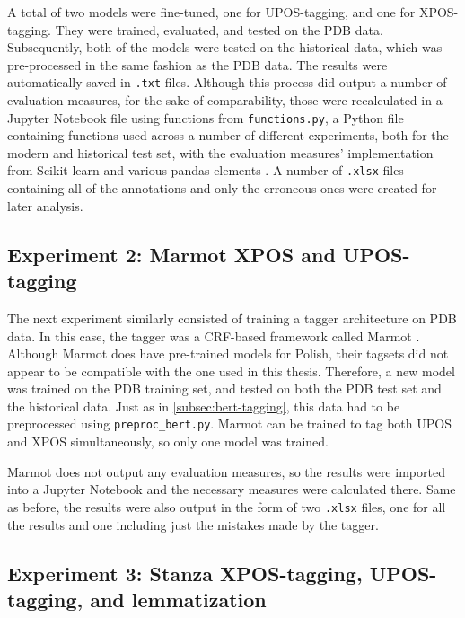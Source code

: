 A total of two models were fine-tuned, one for UPOS-tagging, and one for XPOS-tagging. They were trained, evaluated, and tested on the PDB data. Subsequently, both of the models were tested on the historical data, which was pre-processed in the same fashion as the PDB data. The results were automatically saved in \texttt{.txt} files. Although this process did output a number of evaluation measures, for the sake of comparability, those were recalculated in a Jupyter Notebook file using functions from \texttt{functions.py}, a Python file containing functions used across a number of different experiments, both for the modern and historical test set, with the evaluation measures' implementation from Scikit-learn and various pandas elements \citep{scikit-learn, reback2020pandas, mckinney-proc-scipy-2010}. A number of \texttt{.xlsx} files containing all of the annotations and only the erroneous ones were created for later analysis. 

\subsection{Experiment 2: Marmot XPOS and UPOS-tagging}
\label{subsec:marmot-tagging}

The next experiment similarly consisted of training a tagger architecture on PDB data. In this case, the tagger was a CRF-based framework called Marmot \citep{mueller-etal-2013-efficient}. Although Marmot does have pre-trained models for Polish, their tagsets did not appear to be compatible with the one used in this thesis. Therefore, a new model was trained on the PDB training set, and tested on both the PDB test set and the historical data. Just as in \autoref{subsec:bert-tagging}, this data had to be preprocessed using \texttt{preproc\_bert.py}. Marmot can be trained to tag both UPOS and XPOS simultaneously, so only one model was trained. 

Marmot does not output any evaluation measures, so the results were imported into a Jupyter Notebook and the necessary measures were calculated there. Same as before, the results were also output in the form of two \texttt{.xlsx} files, one for all the results and one including just the mistakes made by the tagger.

\subsection{Experiment 3: Stanza XPOS-tagging, UPOS-tagging, and lemmatization}
\label{subsec:stanza-tagging}


